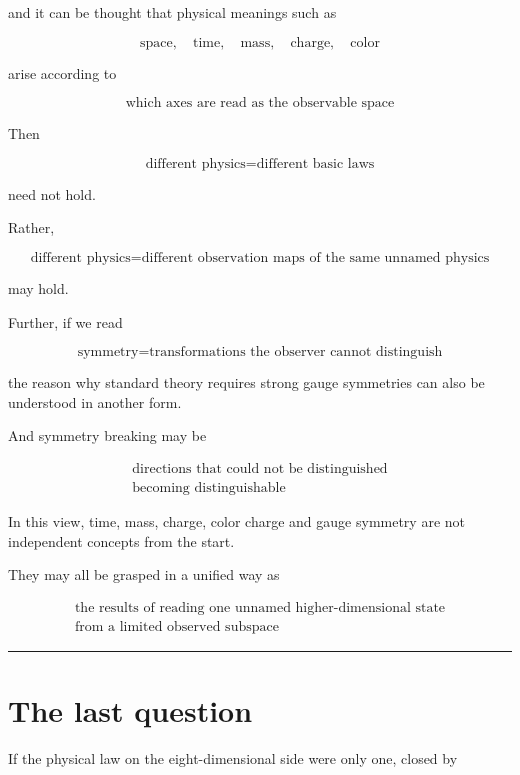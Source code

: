 \documentclass[
  a4paper,
]{article}
\begin{document}
and it can be thought that physical meanings such as

\[
\text{space},
\quad
\text{time},
\quad
\text{mass},
\quad
\text{charge},
\quad
\text{color}
\]

arise according to

\[
\boxed{
\text{which axes are read as the observable space}
}
\]

Then

\[
\boxed{
\text{different physics}
=
\text{different basic laws}
}
\]

need not hold.

Rather,

\[
\boxed{
\text{different physics}
=
\text{different observation maps of the same unnamed physics}
}
\]

may hold.

Further, if we read

\[
\boxed{
\text{symmetry}
=
\text{transformations the observer cannot distinguish}
}
\]

the reason why standard theory requires strong gauge symmetries can also
be understood in another form.

And symmetry breaking may be

\[
\boxed{
\begin{array}{c}
\text{directions that could not be distinguished}\\
\text{becoming distinguishable}
\end{array}
}
\]

In this view, time, mass, charge, color charge and gauge symmetry are
not independent concepts from the start.

They may all be grasped in a unified way as

\[
\boxed{
\begin{array}{c}
\text{the results of reading one unnamed higher-dimensional state}\\
\text{from a limited observed subspace}
\end{array}
}
\]

\begin{center}\rule{0.5\linewidth}{0.5pt}\end{center}

\section{The last question}\label{the-last-question}

If the physical law on the eight-dimensional side were only one, closed
by
\end{document}
